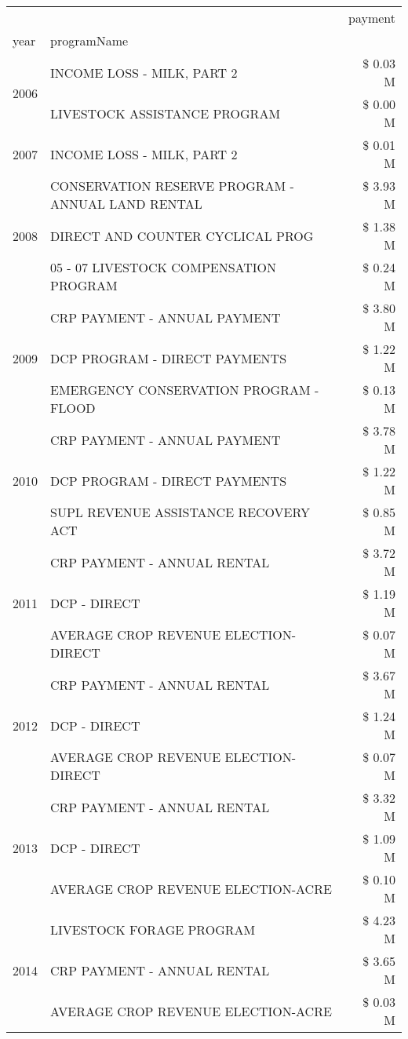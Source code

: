 \begin{tabular}{llr}
\toprule
 &  & payment \\
year & programName &  \\
\midrule
\multirow[t]{2}{*}{2006} & INCOME LOSS - MILK, PART 2 & \$ 0.03 M \\
 & LIVESTOCK ASSISTANCE PROGRAM & \$ 0.00 M \\
\cline{1-3}
2007 & INCOME LOSS - MILK, PART 2 & \$ 0.01 M \\
\cline{1-3}
\multirow[t]{3}{*}{2008} & CONSERVATION RESERVE PROGRAM - ANNUAL LAND RENTAL & \$ 3.93 M \\
 & DIRECT AND COUNTER CYCLICAL PROG & \$ 1.38 M \\
 & 05 - 07 LIVESTOCK COMPENSATION PROGRAM & \$ 0.24 M \\
\cline{1-3}
\multirow[t]{3}{*}{2009} & CRP PAYMENT - ANNUAL PAYMENT & \$ 3.80 M \\
 & DCP PROGRAM - DIRECT PAYMENTS & \$ 1.22 M \\
 & EMERGENCY CONSERVATION PROGRAM - FLOOD & \$ 0.13 M \\
\cline{1-3}
\multirow[t]{3}{*}{2010} & CRP PAYMENT - ANNUAL PAYMENT & \$ 3.78 M \\
 & DCP PROGRAM - DIRECT PAYMENTS & \$ 1.22 M \\
 & SUPL REVENUE ASSISTANCE RECOVERY ACT & \$ 0.85 M \\
\cline{1-3}
\multirow[t]{3}{*}{2011} & CRP PAYMENT - ANNUAL RENTAL & \$ 3.72 M \\
 & DCP - DIRECT & \$ 1.19 M \\
 & AVERAGE CROP REVENUE ELECTION-DIRECT & \$ 0.07 M \\
\cline{1-3}
\multirow[t]{3}{*}{2012} & CRP PAYMENT - ANNUAL RENTAL & \$ 3.67 M \\
 & DCP - DIRECT & \$ 1.24 M \\
 & AVERAGE CROP REVENUE ELECTION-DIRECT & \$ 0.07 M \\
\cline{1-3}
\multirow[t]{3}{*}{2013} & CRP PAYMENT - ANNUAL RENTAL & \$ 3.32 M \\
 & DCP - DIRECT & \$ 1.09 M \\
 & AVERAGE CROP REVENUE ELECTION-ACRE & \$ 0.10 M \\
\cline{1-3}
\multirow[t]{3}{*}{2014} & LIVESTOCK FORAGE PROGRAM & \$ 4.23 M \\
 & CRP PAYMENT - ANNUAL RENTAL & \$ 3.65 M \\
 & AVERAGE CROP REVENUE ELECTION-ACRE & \$ 0.03 M \\

\end{tabular}
